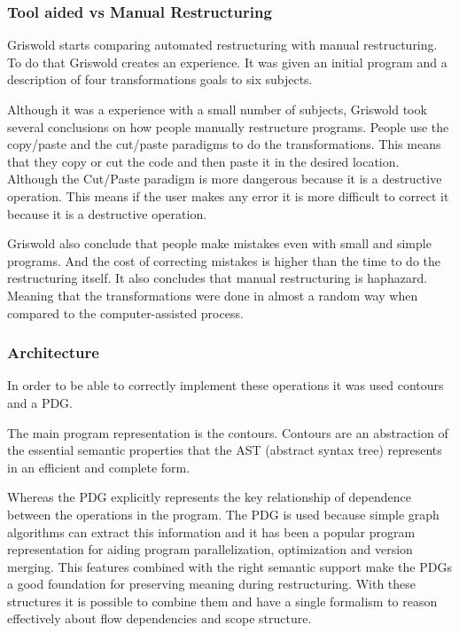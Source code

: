 \subsubsection{Tool aided vs Manual Restructuring}
Griswold starts comparing automated restructuring with manual restructuring. 
To do that Griswold creates an experience.
It was given an initial program and a description of four transformations goals to six subjects.%

Although it was a experience with a small number of subjects, Griswold took several conclusions on how people manually restructure programs.
People use the copy/paste and the cut/paste paradigms to do the transformations. 
This means that they copy or cut the code and then paste it in the desired location.
Although the Cut/Paste paradigm is more dangerous because it is a destructive operation. 
This means if the user makes any error it is more difficult to correct it because it is a destructive operation.

Griswold also conclude that people make mistakes even with small and simple programs. 
And the cost of correcting mistakes is higher than the time to do the restructuring itself. 
It also concludes that manual restructuring is haphazard. 
Meaning that the transformations were done in almost a random way when compared to the computer-assisted process.


\subsubsection{Architecture}

In order to be able to correctly implement these operations it was used contours and a PDG.

The main program representation is the contours. 
Contours are an abstraction of the essential semantic properties that the AST (abstract syntax tree) represents in an efficient and complete form.

Whereas the PDG explicitly represents the key relationship of dependence between the operations in the program. 
The PDG is used because simple graph algorithms can extract this information and it has been a popular program representation for aiding program parallelization, optimization and version merging.
This features combined with the right semantic support make the PDGs a good foundation for preserving meaning during restructuring.
With these structures it is possible to combine them and have a single formalism to reason effectively about flow dependencies and scope structure.


